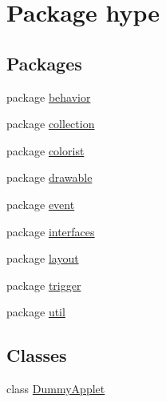 \hypertarget{namespacehype}{\section{Package hype}
\label{namespacehype}
}
\subsection*{Packages}
\begin{DoxyCompactItemize}
\item 
package \hyperlink{namespacehype_1_1behavior}{behavior}
\item 
package \hyperlink{namespacehype_1_1collection}{collection}
\item 
package \hyperlink{namespacehype_1_1colorist}{colorist}
\item 
package \hyperlink{namespacehype_1_1drawable}{drawable}
\item 
package \hyperlink{namespacehype_1_1event}{event}
\item 
package \hyperlink{namespacehype_1_1interfaces}{interfaces}
\item 
package \hyperlink{namespacehype_1_1layout}{layout}
\item 
package \hyperlink{namespacehype_1_1trigger}{trigger}
\item 
package \hyperlink{namespacehype_1_1util}{util}
\end{DoxyCompactItemize}
\subsection*{Classes}
\begin{DoxyCompactItemize}
\item 
class \hyperlink{classhype_1_1_dummy_applet}{Dummy\-Applet}
\end{DoxyCompactItemize}

